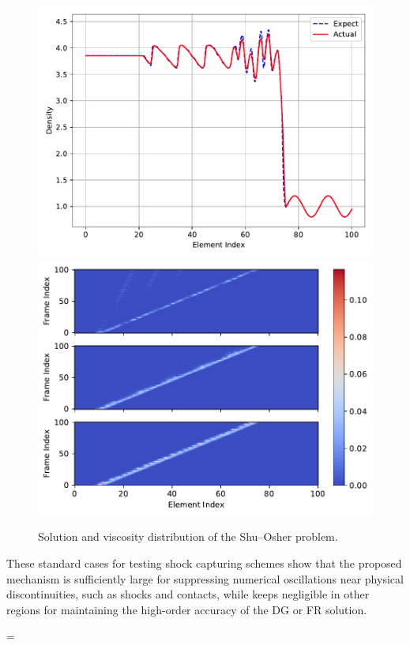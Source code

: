 \documentclass[10pt]{article}
\begin{document}
\begin{figure}[H]
  \centering
  \includegraphics[width=.49\textwidth]{./shu_osher/final/Frame100.pdf}
  \includegraphics[width=.49\textwidth]{./shu_osher/final/Viscosity.pdf}
  \caption{Solution and viscosity distribution of the Shu--Osher problem.}
  \label{fig:shu_osher}
\end{figure}

These standard cases for testing shock capturing schemes show that the proposed mechanism is sufficiently large for suppressing numerical oscillations near physical discontinuities, such as shocks and contacts, while keeps negligible in other regions for maintaining the high-order accuracy of the DG or FR solution.

\bibspacing=


\end{document}
